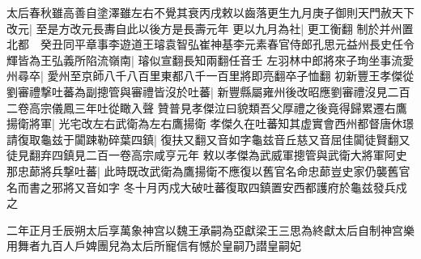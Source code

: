 太后春秋雖高善自塗澤雖左右不覺其衰丙戌敕以齒落更生九月庚子御則天門赦天下改元|{
	至是方改元長夀自此以後方是長壽元年}
更以九月為社|{
	更工衡翻}
制於并州置北都　癸丑同平章事李遊道王璿袁智弘崔神基李元素春官侍郎孔思元益州長史任令輝皆為王弘義所陷流嶺南|{
	璿似宣翻長知兩翻任音壬}
左羽林中郎將來子珣坐事流愛州尋卒|{
	愛州至京師八千八百里東都八千一百里將即亮翻卒子恤翻}
初新豐王孝傑從劉審禮撃吐蕃為副摠管與審禮皆沒於吐蕃|{
	新豐縣屬雍州後改昭應劉審禮沒見二百二卷高宗儀鳳三年吐從瞰入聲}
贊普見孝傑泣曰貌類吾父厚禮之後竟得歸累遷右鷹揚衛將軍|{
	光宅改左右武衛為左右鷹揚衛}
孝傑久在吐蕃知其虚實會西州都督唐休璟請復取龜兹于闐踈勒碎葉四鎮|{
	復扶又翻又音如字龜兹音丘慈又音屈佳闐徒賢翻又徒見翻弃四鎮見二百一卷高宗咸亨元年}
敕以孝傑為武威軍摠管與武衛大將軍阿史那忠蓈將兵撃吐蕃|{
	此時既改武衛為鷹揚衛不應復以舊官名命忠蓈豈史家仍襲舊官名而書之邪將又音如字}
冬十月丙戍大破吐蕃復取四鎮置安西都護府於龜兹發兵戍之

二年正月壬辰朔太后享萬象神宫以魏王承嗣為亞獻梁王三思為終獻太后自制神宫樂用舞者九百人戶婢團兒為太后所寵信有憾於皇嗣乃譛皇嗣妃

